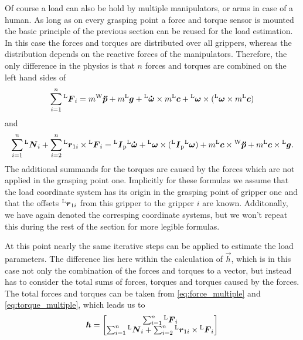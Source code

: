 Of course a load can also be hold by multiple manipulators, or arms in case of a human. As long as on every grasping point a force and torque sensor is mounted the basic principle of the previous section can be reused for the load estimation. In this case the forces and torques are distributed over all grippers, whereas the distribution depends on the reactive forces of the manipulators. Therefore, the only difference in the physics is that $n$ forces and torques are combined on the left hand sides of
\begin{equation}
	\sum_{i = 1}^{n}  {^{\mathrm{L}}}\boldsymbol{F}_{i} = m {^{\mathrm{W}}}\boldsymbol{\ddot{p}} + m {^{\mathrm{L}}}\boldsymbol{g} + {^{\mathrm{L}}}\boldsymbol{\dot{\omega}} \times m {^{\mathrm{L}}}\boldsymbol{c} + {^{\mathrm{L}}}\boldsymbol{\omega} \times ({^{\mathrm{L}}}\boldsymbol{\omega} \times m {^{\mathrm{L}}}\boldsymbol{c})
	\label{eq:force_multiple}	
\end{equation}
and
\begin{equation}
	\sum_{i = 1}^n {^{\mathrm{L}}}\boldsymbol{N}_{i} + \sum_{i = 2}^n {^{\mathrm{L}}}\boldsymbol{r}_{1i} \times {^{\mathrm{L}}}\boldsymbol{F}_{i} = {^{\mathrm{L}}}\boldsymbol{I}_{\mathrm{p}} {^{\mathrm{L}}}\boldsymbol{\dot{\omega}} + {^{\mathrm{L}}}\boldsymbol{\omega} \times ({^{\mathrm{L}}}\boldsymbol{I}_{\mathrm{p}} {^{\mathrm{L}}}\boldsymbol{\omega}) + m {^{\mathrm{L}}}\boldsymbol{c} \times {^{\mathrm{W}}}\boldsymbol{\ddot{p}} + m {^{\mathrm{L}}}\boldsymbol{c} \times {^{\mathrm{L}}}\boldsymbol{g}.
	\label{eq:torque_multiple}	
\end{equation}
The additional summands for the torques are caused by the forces which are not applied in the grasping point one. Implicitly for these formulas we assume that the load coordinate system has its origin in the grasping point of gripper one and that the offsets ${^{\mathrm{L}}}\boldsymbol{r}_{1i}$ from this gripper to the gripper $i$ are known. Additonally, we have again denoted the corresping coordinate systems, but we won't repeat this during the rest of the section for more legible formulas.

At this point nearly the same iterative steps can be applied to estimate the load parameters. The difference lies here within the calculation of $\vec{h}$, which is in this case not only the combination of the forces and torques to a vector, but instead has to consider the total sums of forces, torques and torques caused by the forces. The total forces and torques can be taken from \ref{eq:force_multiple} and \ref{eq:torque_multiple}, which leads us to
\begin{equation}
	\boldsymbol{h} = 
	\begin{bmatrix}
		\sum_{i = 1}^n {^{\mathrm{L}}}\boldsymbol{F}_{i} \\
		\sum_{i = 1}^n {^{\mathrm{L}}}\boldsymbol{N}_{i} + \sum_{i = 2}^n {^{\mathrm{L}}}\boldsymbol{r}_{1i} \times {^{\mathrm{L}}}\boldsymbol{F}_{i}
	\end{bmatrix}
\end{equation}

